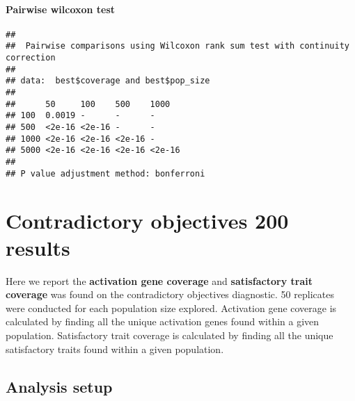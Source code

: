 \documentclass[
]{book}
\newenvironment{Shaded}{\begin{snugshade}}{\end{snugshade}}
\newcommand{\AttributeTok}[1]{\textcolor[rgb]{0.13,0.29,0.53}{#1}}
\newcommand{\ConstantTok}[1]{\textcolor[rgb]{0.56,0.35,0.01}{#1}}
\newcommand{\FunctionTok}[1]{\textcolor[rgb]{0.13,0.29,0.53}{\textbf{#1}}}
\newcommand{\NormalTok}[1]{#1}
\newcommand{\SpecialCharTok}[1]{\textcolor[rgb]{0.81,0.36,0.00}{\textbf{#1}}}
\newcommand{\StringTok}[1]{\textcolor[rgb]{0.31,0.60,0.02}{#1}}
\begin{document}
\hypertarget{pairwise-wilcoxon-test-2}{%
\subsubsection{Pairwise wilcoxon test}\label{pairwise-wilcoxon-test-2}}

\begin{Shaded}
\end{Shaded}

\begin{verbatim}
## 
##  Pairwise comparisons using Wilcoxon rank sum test with continuity correction 
## 
## data:  best$coverage and best$pop_size 
## 
##      50     100    500    1000  
## 100  0.0019 -      -      -     
## 500  <2e-16 <2e-16 -      -     
## 1000 <2e-16 <2e-16 <2e-16 -     
## 5000 <2e-16 <2e-16 <2e-16 <2e-16
## 
## P value adjustment method: bonferroni
\end{verbatim}

\hypertarget{contradictory-objectives-200-results}{%
\chapter{Contradictory objectives 200 results}\label{contradictory-objectives-200-results}}

Here we report the \textbf{activation gene coverage} and \textbf{satisfactory trait coverage} was found on the contradictory objectives diagnostic.
50 replicates were conducted for each population size explored.
Activation gene coverage is calculated by finding all the unique activation genes found within a given population.
Satisfactory trait coverage is calculated by finding all the unique satisfactory traits found within a given population.

\hypertarget{analysis-setup-2}{%
\section{Analysis setup}\label{analysis-setup-2}}
\end{document}
